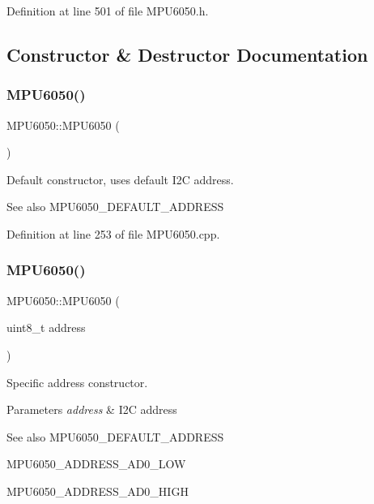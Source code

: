 Definition at line 501 of file M\+P\+U6050.\+h.



\subsection{Constructor \& Destructor Documentation}
\mbox{\label{classMPU6050_a7c0146d45537e4bd7a0d4c1c476fdab7}} 
\subsubsection{\texorpdfstring{MPU6050()}{MPU6050()}\hspace{0.1cm}{\footnotesize\ttfamily [1/2]}}
{\footnotesize\ttfamily M\+P\+U6050\+::\+M\+P\+U6050 (\begin{DoxyParamCaption}{ }\end{DoxyParamCaption})}



Default constructor, uses default I2C address. 

\begin{DoxySeeAlso}{See also}
M\+P\+U6050\+\_\+\+D\+E\+F\+A\+U\+L\+T\+\_\+\+A\+D\+D\+R\+E\+SS 
\end{DoxySeeAlso}


Definition at line 253 of file M\+P\+U6050.\+cpp.

\mbox{\label{classMPU6050_a94df4ec1565317ba5279122b3bf7e056}} 
\subsubsection{\texorpdfstring{MPU6050()}{MPU6050()}\hspace{0.1cm}{\footnotesize\ttfamily [2/2]}}
{\footnotesize\ttfamily M\+P\+U6050\+::\+M\+P\+U6050 (\begin{DoxyParamCaption}\item[{uint8\+\_\+t}]{address }\end{DoxyParamCaption})}



Specific address constructor. 


\begin{DoxyParams}{Parameters}
{\em address} & I2C address \\
\hline
\end{DoxyParams}
\begin{DoxySeeAlso}{See also}
M\+P\+U6050\+\_\+\+D\+E\+F\+A\+U\+L\+T\+\_\+\+A\+D\+D\+R\+E\+SS 

M\+P\+U6050\+\_\+\+A\+D\+D\+R\+E\+S\+S\+\_\+\+A\+D0\+\_\+\+L\+OW 

M\+P\+U6050\+\_\+\+A\+D\+D\+R\+E\+S\+S\+\_\+\+A\+D0\+\_\+\+H\+I\+GH 
\end{DoxySeeAlso}


